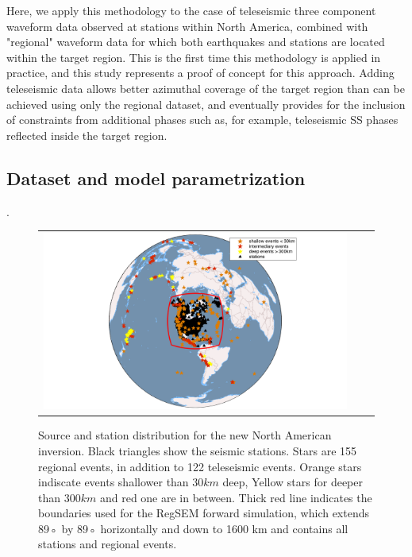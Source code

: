 \documentclass[12pt]{article}
\begin{document}
Here, we apply this methodology to the case of teleseismic three component waveform data observed at stations within North America, combined with "regional" waveform data for which both earthquakes and stations are located within the target region. 
This is the first time this methodology is applied in practice, and this study represents a proof of concept for this approach. 
Adding teleseismic data allows better azimuthal coverage of the target region than can be achieved using only the regional dataset, and eventually provides for the inclusion of constraints from additional phases such as, for example, teleseismic SS phases reflected inside the target region.



\subsection{Dataset and model parametrization}.

\begin{figure}[p]
	\centering
	\begin{tabular}{ccc}
		\includegraphics[width=1\textwidth]{figures/map_events_stn_global.png}
	\end{tabular}

	\caption{\baselineskip 18pt 
	Source and station distribution for the new North American inversion. Black triangles show the seismic stations. Stars are 155 regional events, in addition to 122 teleseismic events. Orange stars indiscate events shallower than $30km$ deep, Yellow stars for deeper than $300km$ and red one are in between. Thick red line indicates the boundaries used for the RegSEM forward simulation, which extends 89◦ by 89◦ horizontally and down to 1600 km and contains all stations and regional events.}

	\label{map_evt_stn}
\end{figure}
\end{document}
